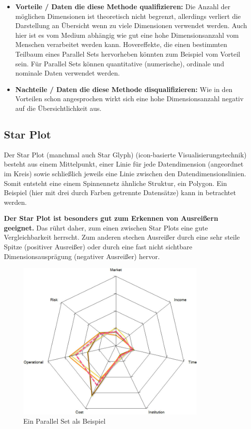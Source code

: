 \documentclass[a4paper,12pt,ngerman]{scrartcl}
\begin{document}
\begin{itemize}
	\item \textbf{Vorteile / Daten die diese Methode qualifizieren:}
	Die Anzahl der möglichen Dimensionen ist theoretisch nicht begrenzt, allerdings verliert die Darstellung an Übersicht wenn zu viele Dimensionen verwendet werden. Auch hier ist es vom Medium abhängig wie gut eine hohe Dimensionsanzahl vom Menschen verarbeitet werden kann. Hovereffekte, die einen bestimmten Teilbaum eines Parallel Sets hervorheben könnten zum Beispiel vom Vorteil sein. Für Parallel Sets können quantitative (numerische), ordinale und nominale Daten verwendet werden.

	\item \textbf{Nachteile / Daten die diese Methode disqualifizieren:}
	Wie in den Vorteilen schon angesprochen wirkt sich eine hohe Dimensionsanzahl negativ auf die Übersichtlichkeit aus.

\end{itemize}

\subsection*{Star Plot}
Der Star Plot (manchmal auch Star Glyph) (icon-basierte Visualisierungstechnik) besteht aus einem Mittelpunkt, einer Linie für jede Datendimension (angeordnet im Kreis) sowie schließlich jeweils eine Linie zwischen den Datendimensionslinien. Somit entsteht eine einem Spinnennetz ähnliche Struktur, ein Polygon. Ein Beispiel (hier mit drei durch Farben getrennte Datensätze) kann in  betrachtet werden.


\textbf{Der Star Plot ist besonders gut zum Erkennen von Ausreißern geeignet.} Das rührt daher, zum einen zwischen Star Plots eine gute Vergleichbarkeit herrscht. Zum anderen stechen Ausreißer durch eine sehr steile Spitze (positiver Ausreißer) oder durch eine fast nicht sichtbare Dimensionsausprägung (negativer Ausreißer) hervor.

\begin{figure}[ht]
    \centering
    \includegraphics[height=8cm]{includes/star-plot}
    \caption{Ein Parallel Set als Beispiel}
    \label{fig:star-plot}
\end{figure}
\end{document}
